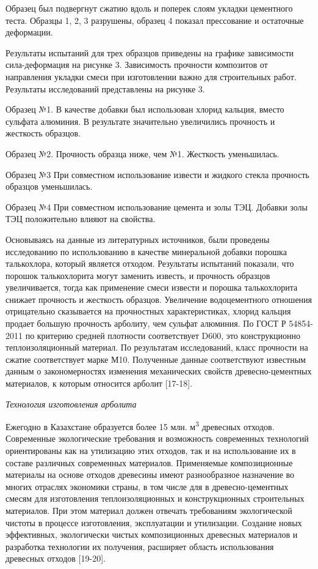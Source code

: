 \begin{multicols}{2}
Образец был подвергнут сжатию вдоль и поперек слоям укладки цементного
теста. Образцы 1, 2, 3 разрушены, образец 4 показал прессование и
остаточные деформации.

Результаты испытаний для трех образцов приведены на графике зависимости
сила-деформация на рисунке 3. Зависимость прочности композитов от
направления укладки смеси при изготовлении важно для строительных работ.
Результаты исследований представлены на рисунке 3.

Образец №1. В качестве добавки был использован хлорид кальция, вместо
сульфата алюминия. В результате значительно увеличились прочность и
жесткость образцов.

Образец №2. Прочность образца ниже, чем №1. Жесткость уменьшилась.

Образец №3 При совместном использование извести и жидкого стекла
прочность образцов уменьшилась.

Образец №4 При совместном использование цемента и золы ТЭЦ. Добавки золы
ТЭЦ положительно влияют на свойства.

Основываясь на данные из литературных источников, были проведены
исследованию по использованию в качестве минеральной добавки порошка
талькохлора, который является отходом. Результаты испытаний показали,
что порошок талькохлорита могут заменить известь, и прочность образцов
увеличивается, тогда как применение смеси извести и порошка
талькохлорита снижает прочность и жесткость образцов. Увеличение
водоцементного отношения отрицательно сказывается на прочностных
характеристиках, хлорид кальция продает большую прочность арболиту, чем
сульфат алюминия. По ГОСТ Р 54854-2011 по критерию средней плотности
соответствует D600, это конструкционно теплоизоляционный материал. По
результатам исследований, класс прочности на сжатие соответствует марке
М10. Полученные данные соответствуют известным данным о закономерностях
изменения механических свойств древесно-цементных материалов, к которым
относится арболит {[}17-18{]}.

\emph{Технология изготовления арболита}

Ежегодно в Казахстане образуется более 15 млн. м\textsuperscript{3}
древесных отходов. Современные экологические требования и возможность
современных технологий ориентированы как на утилизацию этих отходов, так
и на использование их в составе различных современных материалов.
Применяемые композиционные материалы на основе отходов древесины имеют
разнообразное назначение во многих отраслях экономики страны, в том
числе для в древесно-цементных смесям для изготовления теплоизоляционных
и конструкционных строительных материалов. При этом материал должен
отвечать требованиям экологической чистоты в процессе изготовления,
эксплуатации и утилизации. Создание новых эффективных, экологически
чистых композиционных древесных материалов и разработка технологии их
получения, расширяет область использования древесных отходов
{[}19-20{]}.
\end{multicols}

